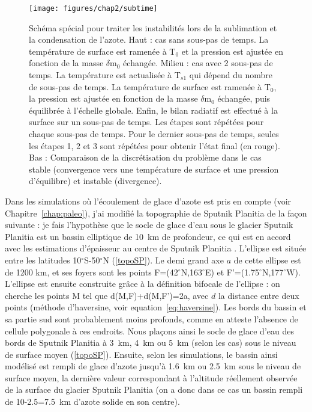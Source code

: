 \begin{figure}[!h]
\begin{center} 
	\texttt{[image: figures/chap2/subtime]}
\end{center} 
\caption{Schéma spécial pour traiter les instabilités lors de la sublimation et la condensation de l’azote. Haut : cas sans sous-pas de temps. La température de surface est ramenée à T$_0$ et la pression est ajustée en fonction de la masse $\delta$m$_0$ échangée. Milieu : cas avec 2 sous-pas de temps. La température est actualisée à T$_{s1}$ qui dépend du nombre de sous-pas de temps. La température de surface est ramenée à T$_0$, la pression est ajustée en fonction de la masse $\delta$m$_0$ échangée, puis équilibrée à l’échelle globale. Enfin, le bilan radiatif est effectué à la surface sur un sous-pas de temps. Les étapes sont répétées pour chaque sous-pas de temps. Pour le dernier sous-pas de temps, seules les étapes 1, 2 et 3 sont répétées pour obtenir l’état final (en rouge). Bas : Comparaison de la discrétisation du problème dans le cas stable (convergence vers une température de surface et une pression d’équilibre) et instable (divergence).} 
\label{equilibre}
\end{figure}

\clearpage

Dans les simulations où l’écoulement de glace d’azote est pris en compte (voir Chapitre~\ref{chap:paleo}), j’ai modifié la topographie de Sputnik Planitia de la façon suivante : je fais l’hypothèse que le socle de glace d’eau sous le glacier Sputnik Planitia est un bassin elliptique de 10~km de profondeur, ce qui est en accord avec les estimations d’épaisseur au centre de Sputnik Planitia \citep{Moor:16, McKi:16, Trow:16, Kean:16}. L’ellipse est située entre les latitudes 10$^{\circ}$S-50$^{\circ}$N (\autoref{topoSP}). Le demi grand axe $a$ de cette ellipse est de 1200 km, et ses foyers sont les points F=(42$^{\circ}$N,163$^{\circ}$E) et F’=(1.75$^{\circ}$N,177$^{\circ}$W). L’ellipse est ensuite construite grâce à la définition bifocale de l’ellipse : on cherche les points M tel que d(M,F)+d(M,F’)=2a, avec $d$ la distance entre deux points (méthode d’haversine, voir equation~\ref{eq:haversine}).  
Les bords du bassin et sa partie sud sont probablement moins profonds, comme en atteste l’absence de cellule polygonale à ces endroits. Nous plaçons ainsi le socle de glace d’eau des bords de Sputnik Planitia à 3~km, 4~km ou 5~km (selon les cas) sous le niveau de surface moyen (\autoref{topoSP}).
Ensuite, selon les simulations, le bassin ainsi modélisé est rempli de glace d’azote jusqu’à 1.6~km ou 2.5~km sous le niveau de surface moyen, la dernière valeur correspondant à l’altitude réellement observée de la surface du glacier Sputnik Planitia (on a donc dans ce cas un bassin rempli de 10-2.5=7.5~km d’azote solide en son centre). 

